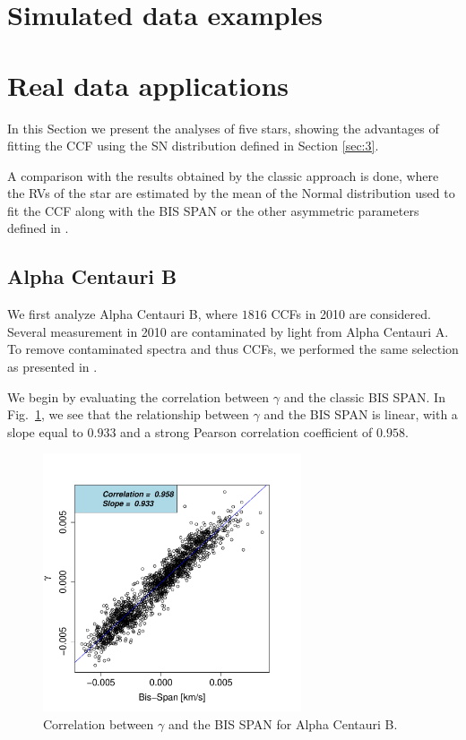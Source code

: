 \documentclass[11pt, oneside]{article}
\begin{document}
\section{Simulated data examples} \label{sec:soap}






\section{Real data applications} \label{sec:4}

In this Section we present the analyses of five stars, showing the advantages of fitting the CCF using the SN distribution defined in Section \ref{sec:3}. 

A comparison with the results obtained by the classic approach is done, where the RVs of the star are estimated by the mean of the Normal distribution used to fit the CCF along with the BIS SPAN or the other asymmetric parameters defined in \citet{Figueira-2013}.

\subsection{Alpha Centauri B} \label{sec:alphacentb}

We first analyze Alpha Centauri B, where $1816$ CCFs in 2010 are considered. Several measurement in 2010 are contaminated by light from Alpha Centauri A. To remove contaminated spectra and thus CCFs, we performed the same selection as presented in \citet{Dumusque-2012}.

We begin by evaluating the correlation between $\gamma$ and the classic BIS SPAN. In Fig.~\ref{fig:alphacent:corr.gamma}, we see that the relationship between $\gamma$ and the BIS SPAN is linear, with a slope equal to $0.933$ and a strong Pearson correlation coefficient of $0.958$. 
%
\begin{figure}[htbp]
   \centering
\includegraphics[height = 3in]{HD12862_[2]gamma_vs_bisspan.pdf} 
   \caption{Correlation between $\gamma$ and the BIS SPAN for Alpha Centauri B.}
   \label{fig:alphacent:corr.gamma}
\end{figure}
\end{document}
